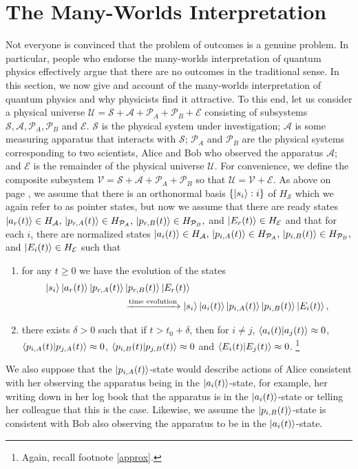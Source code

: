 \documentclass[letter, 12pt]{turabian-thesis}
\theoremstyle{hypothesis}
\let\origfootnote\footnote %
\renewcommand{\footnote}[1]{%
\noindent %
\origfootnote{#1}}
\begin{document}
\section{The Many-Worlds Interpretation}\label{manyworldsinterpretation1}
Not everyone is convinced that the problem of outcomes is a genuine problem. In particular, people who endorse the many-worlds interpretation of quantum physics effectively argue that there are no outcomes in the traditional sense. In this section, we now give and account of the many-worlds interpretation of quantum physics and why physicists find it attractive. To this end, let us consider a physical universe $\mathcal{U}=\mathcal{S}+\mathcal{A}+\mathcal{P}_A+\mathcal{P}_B+\mathcal{E}$ consisting of subsystems $\mathcal{S}, \mathcal{A}, \mathcal{P}_A,\mathcal{P}_B$ and $\mathcal{E}$. $\mathcal{S}$ is the physical system under investigation; $\mathcal{A}$ is some measuring apparatus that interacts with $\mathcal{S}$; $\mathcal{P}_A$ and $\mathcal{P}_B$ are the physical systems corresponding to two scientists, Alice and Bob who observed the apparatus $\mathcal{A}$; and $\mathcal{E}$ is the remainder of the physical universe $\mathcal{U}$.  For convenience, we define the composite subsystem $\mathcal{V}=\mathcal{S}+\mathcal{A}+\mathcal{P}_A+\mathcal{P}_B$ so that $\mathcal{U}=\mathcal{V}+\mathcal{E}$. As above on page \pageref{pointer}, we  assume that there is an orthonormal basis $\{\ket{s_i}:i\}$ of $H_\mathcal{S}$ which we again refer to as pointer states, but now we assume that there are ready states $\ket{a_r(t)}\in H_\mathcal{A},\,\ket{p_{r, A}(t)}\in H_{\mathcal{P}_A},\,\ket{p_{r, B}(t)}\in H_{\mathcal{P}_B},$ and $\ket{E_r(t)}\in H_\mathcal{E}$ and that for each $i$, there are normalized states $\ket{a_i(t)}\in H_\mathcal{A},\,\ket{p_{i, A}(t)}\in H_{\mathcal{P}_A},\,\ket{p_{i, B}(t)}\in H_{\mathcal{P}_B},$ and $\ket{E_i(t)}\in H_\mathcal{E}$ such that 
\begin{enumerate}[noitemsep, nosep, topsep=0pt]
\item for any $t\geq 0$ we have the evolution of the states 
\begin{align*}\ket{s_i}\ket{a_r(t)}\ket{p_{r, A}(t)}&\ket{p_{r, B}(t)}\ket{E_r(t)}\\ &\xrightarrow{\text{time evolution}}\ket{s_i}\ket{a_i(t)}\ket{p_{i, A}(t)}\ket{p_{i, B}(t)}\ket{E_i(t)},\end{align*}
\item there exists $\delta>0$ such that if $t>t_0+\delta$, then for $i\neq j$, $\ip{a_i(t)}{a_j(t)}\approx 0$, $\ip{p_{i, A}(t)}{p_{j, A}(t)}\approx 0$, $\ip{p_{i, B}(t)}{p_{j, B}(t)}\approx 0$ and $\ip{E_i(t)}{E_j(t)}\approx 0$.\footnote{Again, recall footnote \ref{approx}.}
\end{enumerate}
We also suppose that the $\ket{p_{i,A}(t)}$-state would describe actions of Alice consistent with her observing the apparatus being in the $\ket{a_i(t)}$-state, for example, her writing down in her log book that the apparatus is in the $\ket{a_i(t)}$-state or telling her colleague that this is the case. Likewise, we assume the $\ket{p_{i,B}(t)}$-state is consistent with Bob also observing the apparatus to be in the $\ket{a_i(t)}$-state.
\end{document}
